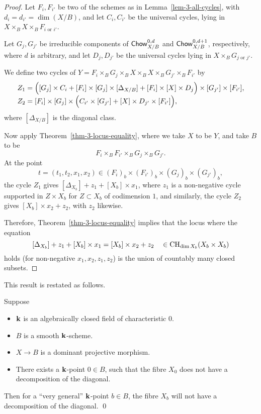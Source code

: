 \begin{proof}
    Let $F_i, F_{i'}$ be two of the schemes as in Lemma~\ref{lem-3-all-cycles}, 
    with $d_i = d_{i'} = \dim (X/B)$,
    and let $C_i, C_{i'}$ be the universal cycles,
    lying in $X \times_B X \times_B F_{i \text{ or } i'}$. 
    
    Let $G_j, G_{j'}$ be irreducible components of 
    $\textsf{\textup{Chow}}_{X/B}^{0,d}$ and $\textsf{\textup{Chow}}_{X/B}^{0,d + 1}$,
    respectively, where $d$ is arbitrary,
    and let $D_j, D_{j'}$ be the universal cycles lying in $X \times_B G_{j \text{ or } j'}$.
    
    We define two cycles of $Y = F_i \times_B G_j \times_B X \times_B X \times_B G_{j'} \times_B F_{i'}$ by
    \[ \begin{aligned}
        Z_1 &= \Bigl( [G_j] \times C_i + [F_i] \times [G_j] \times [\Delta_{X/B}] + [F_i] \times [X] \times D_j \Bigr) 
            \times [G_{j'}] \times [F_{i'}], \\[-3pt]
        Z_2 &= [F_i] \times [G_j] \times \Bigl( C_{i'} \times [G_{j'}] + [X] \times D_{j'} \times [F_{i'}] \Bigr),
    \end{aligned} \]
    where $[\Delta_{X/B}]$ is the diagonal class.

    Now apply Theorem~\ref{thm-3-locus-equality}, where we take $X$ to be $Y$, 
    and take $B$ to be 
    \[ F_i \times_B F_{i'} \times_B G_j \times_B G_{j'}. \]
    At the point 
    \[ t = (t_1, t_2, x_1, x_2) \in (F_i)_b \times (F_{i'})_b \times (G_j)_b \times (G_{j'})_b, \]
    the cycle $Z_1$ gives $[\Delta_{X_b}] + z_1 + [X_b] \times x_1$,
    where $z_1$ is a non-negative cycle
    supported in $Z \times X_b$ for $Z \subset X_b$ of codimension $1$,
    and similarly, the cycle $Z_2$ gives $[X_b] \times x_2 + z_2$,
    with $z_2$ likewise.

    Therefore, Theorem~\ref{thm-3-locus-equality} implies that
    the locus where the equation
    \[ [\Delta_{X_b}] + z_1 + [X_b] \times x_1 = [X_b] \times x_2 + z_2 \quad \in \mathrm{CH}_{\dim X_b} (X_b \times X_b) \]
    holds (for non-negative $x_1, x_2, z_1, z_2$)
    is the union of countably many closed subsets.
\end{proof}

This result is restated as follows.

\begin{theorem} \label{thm-3-locus-decomp}
    Suppose 
    \begin{itemize}
        \item
            $\bbk$ is an algebraically closed field of characteristic $0$.
        \item
            $B$ is a smooth $\bbk$-scheme.
        \item
            $X \to B$ is a dominant projective morphism.
        \item
            There exists a $\bbk$-point $0 \in B$,
            such that the fibre $X_0$ does not have a decomposition of the diagonal.
    \end{itemize}
    Then for a ``very general'' $\bbk$-point $b \in B$,
    the fibre $X_b$ will not have a decomposition of the diagonal. \qed
\end{theorem}

